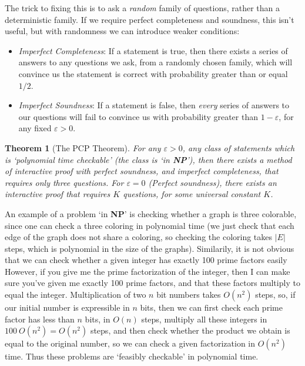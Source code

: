 \documentclass{article}
\theoremstyle{plain}
\newtheorem{theorem}{Theorem}
\theoremstyle{definition}
\begin{document}
The trick to fixing this is to ask a \emph{random} family of questions, rather than a deterministic family. If we require perfect completeness and soundness, this isn't useful, but with randomness we can introduce weaker conditions:
%
\begin{itemize}
    \item \emph{Imperfect Completeness}: If a statement is true, then there exists a series of answers to any questions we ask, from a randomly chosen family, which will convince us the statement is correct with probability greater than or equal $1/2$.

    \item \emph{Imperfect Soundness}: If a statement is false, then {\it every} series of answers to our questions will fail to convince us with probability greater than $1 - \varepsilon$, for any fixed $\varepsilon > 0$.
\end{itemize}

\begin{theorem}[The PCP Theorem]
    For any $\varepsilon > 0$, any class of statements which is `polynomial time checkable' (the class is `in {\bf NP}'), then there exists a method of interactive proof with perfect soundness, and imperfect completeness, that requires only three questions. For $\varepsilon = 0$ (Perfect soundness), there exists an interactive proof that requires $K$ questions, for some universal constant $K$.
\end{theorem}

An example of a problem `in {\bf NP}' is checking whether a graph is three colorable, since one can check a three coloring in polynomial time (we just check that each edge of the graph does not share a coloring, so checking the coloring takes $|E|$ steps, which is polynomial in the size of the graphs). Similarily, it is not obvious that we can check whether a given integer has exactly 100 prime factors easily %
%
%
However, if you give me the prime factorization of the integer, then I can make sure you've given me exactly 100 prime factors, and that these factors multiply to equal the integer. Multiplication of two $n$ bit numbers takes $O(n^2)$ steps, so, if our initial number is expressible in $n$ bits, then we can first check each prime factor has less than $n$ bits, in $O(n)$ steps, multiply all these integers in $100\ O(n^2) = O(n^2)$ steps, and then check whether the product we obtain is equal to the original number, so we can check a given factorization in $O(n^2)$ time. Thus these problems are `feasibly checkable' in polynomial time.
\end{document}
